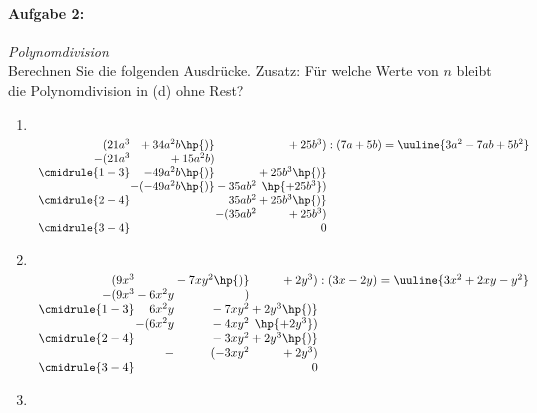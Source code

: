 \paragraph{Aufgabe 2: } \emph{Polynomdivision}\\[0.2cm]
Berechnen Sie die folgenden Ausdrücke. Zusatz: Für welche Werte von $n$ bleibt die Polynomdivision in (d) ohne Rest?
\begin{enumerate}[label=(\alph*), labelindent=1em,labelsep=0.5cm]
    \item$~$\\[-1.3cm]
    \begin{align}
        \begin{array}{r@{} r@{} r@{} r@{} r}
            (21a^3 &{}+34a^2b\hp{)}&{}&{}+25b^3) &\;:(7a+5b) = \uuline{3a^2-7ab+5b^2} \\
          -(21a^3 &{}+15a^2b) \\ 
          \cmidrule{1-3}
                & -49a^2 b\hp{)} &{}&{}+25b^3\hp{)}\\
                &-(-49a^2 b\hp{)}&{}-35ab^2&{}\hp{+25b^3}) \\
          \cmidrule{2-4}
                & &{}35ab^2&{}+25b^3\hp{)}\\
                & &-(35ab^2&{}+25b^3)\\
          \cmidrule{3-4} 
                & & & 0
        \end{array}
    \end{align}
    \item$~$\\[-1.3cm]
    \begin{align}
        \begin{array}{r@{} r@{} r@{} r@{} r}
            (9x^3 &{}&{}-7xy^2\hp{)}&{}+2y^3) &\;:(3x-2y) = \uuline{3x^2+2xy-y^2} \\
          -(9x^3 &{}-6x^2y&{}) \\ 
          \cmidrule{1-3}
                & 6x^2y &{} -7xy^2 &{}+2y^3\hp{)}\\
                &-(6x^2y&{} -4xy^2&{}\hp{+2y^3}) \\
          \cmidrule{2-4}
                & &{}-3xy^2&{}+2y^3\hp{)}\\
                & -&(-3xy^2&{}+2y^3)\\
          \cmidrule{3-4} 
                & & & 0
        \end{array}
    \end{align}
    \item$~$\\[-1.3cm]

\end{enumerate}

